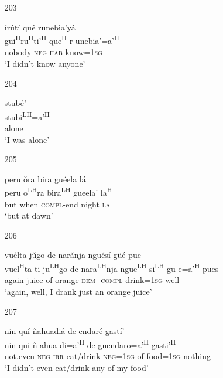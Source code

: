\begin{itemize}
\item[203]
 
\glll   \'{i}r\'{u}t\'{i} qu\'{e} runebia'y\'{a} \\
gui\textsuperscript{H}ru\textsuperscript{H}ti'\textsuperscript{H} que\textsuperscript{H} r-unebia'=a'\textsuperscript{H} \\
nobody \textsc{neg} \textsc{hab}-know=\textsc{1sg}\\
\glt `I didn't know anyone'
 


\item[204]
 
\glll  stub\'{e}'\\
stubi\textsuperscript{LH}=a'\textsuperscript{H}\\
alone\\
\glt `I was alone'
 



\item[205]
 
\glll   peru \v{o}ra bira gu\'{e}ela l\'{a} \\
 peru  o\textsuperscript{LH}ra bira\textsuperscript{LH} gueela' la\textsuperscript{H} \\
 but when \textsc{compl}-end night \textsc{la}\\
\glt `but at dawn'
 


\item[206]
 
\glll   vu\'{e}lta j\v{u}go de nar\v{a}nja ngu\'{e}s\'{i} g\"{u}\'{e} pue\\
vuel\textsuperscript{H}ta ti ju\textsuperscript{LH}go de nara\textsuperscript{LH}nja ngue\textsuperscript{LH}-si\textsuperscript{LH} gu-e=a'\textsuperscript{H} pues\\
 again juice of orange \textsc{dem}- \textsc{compl}-drink=\textsc{1sg} well\\
\glt `again, well, I drank just an orange juice'
 


\item[207]

\glll nin qu\'{i} \~{n}ahuadi\'{a} de endar\'{e} gast\'{i}'\\
nin qui \~{n}-ahua-di=a'\textsuperscript{H} de guendaro=a'\textsuperscript{H} gasti'\textsuperscript{H}\\
not.even \textsc{neg} \textsc{irr}-eat/drink-\textsc{neg}=\textsc{1sg} of food=\textsc{1sg} nothing\\
\glt `I didn't even eat/drink any of my food'



\end{itemize}
